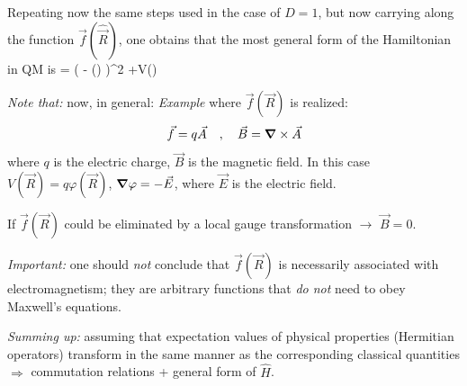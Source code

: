 \documentclass[12pt]{article}
\begin{document}
Repeating now the same steps used in the
case of $D=1$, but now carrying along the
function $\vec{f}(\hat{\vec{R}})$, one obtains that the most
general form of the Hamiltonian in QM is
\be
{} = 
\left(
 - ()
\right)^2
+V()
\ee

\emph{Note that:} now, in general:
\be
{} \neq {}
\ee
\emph{Example} where $\vec{f}(\vec{R})$ is realized:
\[
\vec{f} = q\vec{A}\quad,\quad\vec{B} = \grad\times\vec{A}
\]
where $q$ is the electric charge, $\vec{B}$ is the magnetic field.
In this case $V(\vec{R}) = q \varphi(\vec{R})$, $\grad\varphi = -\vec{E}$, where $\vec{E}$ is the electric field.

If $\vec{f}(\vec{R})$  could be eliminated by a local gauge
transformation $\rightarrow$ $\vec{B} = 0$.


\emph{Important:} one should \emph{not} conclude that
$\vec{f}(\vec{R})$ is necessarily associated with electromagnetism;
they are arbitrary functions that \emph{do not} need to
obey Maxwell's equations.


\emph{Summing up:} assuming that expectation values
of physical properties (Hermitian operators) transform
in the same manner as the corresponding classical quantities
$\Rightarrow$ commutation relations + general form of $\hat{H}$.
\end{document}
